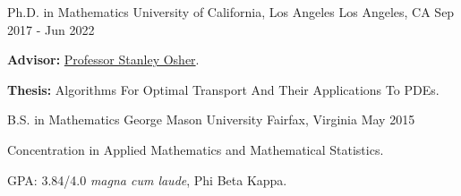 

\begin{cventries}

  \cventry
    {Ph.D. in Mathematics} %
    {University of California, Los Angeles} %
    {Los Angeles, CA} %
    {Sep 2017 - Jun 2022} %
    {
      \begin{cvitems} %
        \item {\textbf{Advisor:} \href{https://www.math.ucla.edu/~sjo/}{Professor Stanley Osher}.}
        \item {\textbf{Thesis:} Algorithms For Optimal Transport And Their Applications To PDEs.}
      \end{cvitems}
    }
    
  \cventry
    {B.S. in Mathematics} %
    {George Mason University} %
    {Fairfax, Virginia} %
    {May 2015} %
    {\begin{cvitems} %
      \item Concentration in Applied Mathematics and Mathematical Statistics.
      \item GPA: 3.84/4.0 \textit{magna cum laude}, Phi Beta Kappa.
    \end{cvitems}
    }
    
\end{cventries}
